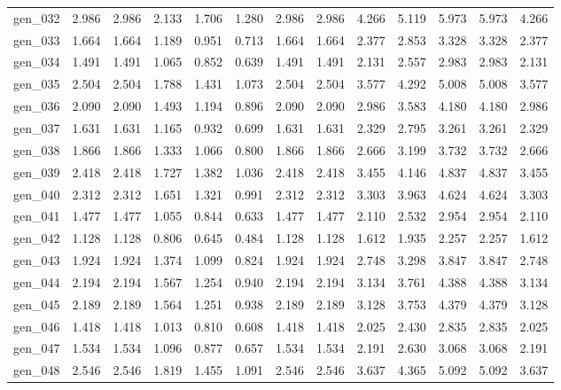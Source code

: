 \begin{tabular}{lrrrrrrrrrrrr}
gen\_032 &  2.986 &  2.986 &  2.133 &  1.706 &  1.280 &  2.986 &  2.986 &  4.266 &  5.119 &  5.973 &  5.973 &  4.266 \\
gen\_033 &  1.664 &  1.664 &  1.189 &  0.951 &  0.713 &  1.664 &  1.664 &  2.377 &  2.853 &  3.328 &  3.328 &  2.377 \\
gen\_034 &  1.491 &  1.491 &  1.065 &  0.852 &  0.639 &  1.491 &  1.491 &  2.131 &  2.557 &  2.983 &  2.983 &  2.131 \\
gen\_035 &  2.504 &  2.504 &  1.788 &  1.431 &  1.073 &  2.504 &  2.504 &  3.577 &  4.292 &  5.008 &  5.008 &  3.577 \\
gen\_036 &  2.090 &  2.090 &  1.493 &  1.194 &  0.896 &  2.090 &  2.090 &  2.986 &  3.583 &  4.180 &  4.180 &  2.986 \\
gen\_037 &  1.631 &  1.631 &  1.165 &  0.932 &  0.699 &  1.631 &  1.631 &  2.329 &  2.795 &  3.261 &  3.261 &  2.329 \\
gen\_038 &  1.866 &  1.866 &  1.333 &  1.066 &  0.800 &  1.866 &  1.866 &  2.666 &  3.199 &  3.732 &  3.732 &  2.666 \\
gen\_039 &  2.418 &  2.418 &  1.727 &  1.382 &  1.036 &  2.418 &  2.418 &  3.455 &  4.146 &  4.837 &  4.837 &  3.455 \\
gen\_040 &  2.312 &  2.312 &  1.651 &  1.321 &  0.991 &  2.312 &  2.312 &  3.303 &  3.963 &  4.624 &  4.624 &  3.303 \\
gen\_041 &  1.477 &  1.477 &  1.055 &  0.844 &  0.633 &  1.477 &  1.477 &  2.110 &  2.532 &  2.954 &  2.954 &  2.110 \\
gen\_042 &  1.128 &  1.128 &  0.806 &  0.645 &  0.484 &  1.128 &  1.128 &  1.612 &  1.935 &  2.257 &  2.257 &  1.612 \\
gen\_043 &  1.924 &  1.924 &  1.374 &  1.099 &  0.824 &  1.924 &  1.924 &  2.748 &  3.298 &  3.847 &  3.847 &  2.748 \\
gen\_044 &  2.194 &  2.194 &  1.567 &  1.254 &  0.940 &  2.194 &  2.194 &  3.134 &  3.761 &  4.388 &  4.388 &  3.134 \\
gen\_045 &  2.189 &  2.189 &  1.564 &  1.251 &  0.938 &  2.189 &  2.189 &  3.128 &  3.753 &  4.379 &  4.379 &  3.128 \\
gen\_046 &  1.418 &  1.418 &  1.013 &  0.810 &  0.608 &  1.418 &  1.418 &  2.025 &  2.430 &  2.835 &  2.835 &  2.025 \\
gen\_047 &  1.534 &  1.534 &  1.096 &  0.877 &  0.657 &  1.534 &  1.534 &  2.191 &  2.630 &  3.068 &  3.068 &  2.191 \\
gen\_048 &  2.546 &  2.546 &  1.819 &  1.455 &  1.091 &  2.546 &  2.546 &  3.637 &  4.365 &  5.092 &  5.092 &  3.637 \\

\end{tabular}
